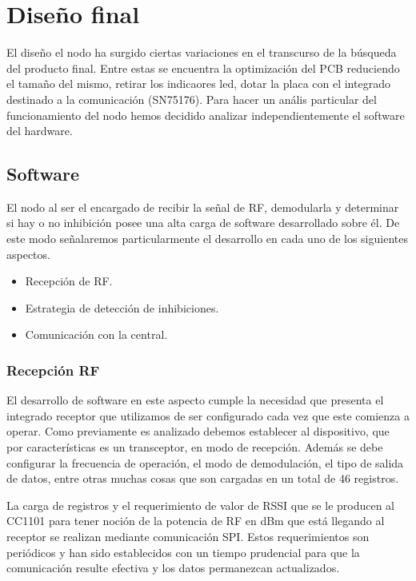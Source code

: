 \section{Diseño final}

El diseño el nodo ha surgido ciertas variaciones en el transcurso de la búsqueda del producto final. Entre estas se encuentra
la optimización del PCB reduciendo el tamaño del mismo, retirar los indicaores led, dotar la placa con el integrado destinado 
a la comunicación (SN75176). Para hacer un anális particular del funcionamiento del nodo hemos decidido analizar independientemente
el software del hardware.

\subsection{Software}

El nodo al ser el encargado de recibir la señal de RF, demodularla y determinar si hay o no inhibición posee una alta carga 
de software desarrollado sobre él. De este modo señalaremos particularmente el desarrollo en cada uno de los siguientes 
aspectos.

\begin{itemize}
	\item Recepción de RF.
	\item Estrategia de detección de inhibiciones.
	\item Comunicación con la central.
\end{itemize}

\subsubsection{Recepción RF}

El desarrollo de software en este aspecto cumple la necesidad que presenta el integrado receptor que utilizamos de ser 
configurado cada vez que este comienza a operar. Como previamente es analizado debemos establecer al dispositivo, que por
características es un transceptor, en modo de recepción. Además se debe configurar la frecuencia de operación, el modo de 
demodulación, el tipo de salida de datos, entre otras muchas cosas que son cargadas en un total de 46 registros. \par 
La carga de registros y el requerimiento de valor de RSSI que se le producen al CC1101 para tener noción de la potencia 
de RF en dBm que está llegando al receptor se realizan mediante comunicación SPI. Estos requerimientos son periódicos y 
han sido establecidos con un tiempo prudencial para que la comunicación resulte efectiva y los datos permanezcan actualizados.


